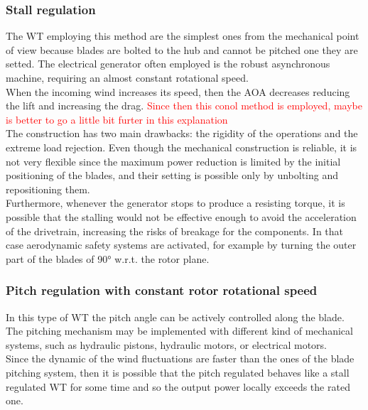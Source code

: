 \subsubsection{Stall regulation}\label{subsec:stall_regulation_theory}
The \acrshort{WT} employing this method are the simplest ones from the mechanical point of view because blades are bolted to the hub and cannot be pitched one they are setted. The electrical generator often employed is the robust asynchronous machine, requiring an almost constant rotational speed.\\
When the incoming wind increases its speed, then the \acrshort{AOA} decreases reducing the lift and increasing the drag. \textcolor{red}{Since then this conol method is employed, maybe is better to go a little bit furter in this explanation}\\
The construction has two main drawbacks: the rigidity of the operations and the extreme load rejection. Even though the mechanical construction is reliable, it is not very flexible since the maximum power reduction is limited by the initial positioning of the blades, and their setting is possible only by unbolting and repositioning them.\\
Furthermore, whenever the generator stops to produce a resisting torque, it is possible that the stalling would not be effective enough to avoid the acceleration of the drivetrain, increasing the risks of breakage for the components. In that case aerodynamic safety systems are activated, for example by turning the outer part of the blades of 90$\si{\degree}$ w.r.t. the rotor plane. 

\subsubsection{Pitch regulation with constant rotor rotational speed}
In this type of \acrshort{WT} the pitch angle can be actively controlled along the blade. The pitching mechanism may be implemented with different kind of mechanical systems, such as hydraulic pistons, hydraulic motors, or electrical motors. \\
Since the dynamic of the wind fluctuations are faster than the ones of the blade pitching system, then it is possible that the pitch regulated behaves like a stall regulated \acrshort{WT} for some time and so the output power locally exceeds the rated one.

